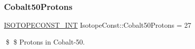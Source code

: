 \subsubsection{\texorpdfstring{Cobalt50\+Protons}{Cobalt50Protons}}
{\footnotesize\ttfamily \mbox{\hyperlink{group___isotope_const-_macros_ga5f18360b3e99483a35c32d789e62621c}{I\+S\+O\+T\+O\+P\+E\+C\+O\+N\+S\+T\+\_\+\+I\+NT}} Isotope\+Const\+::\+Cobalt50\+Protons = 27}

\$ \$ Protons in Cobalt-\/50. 